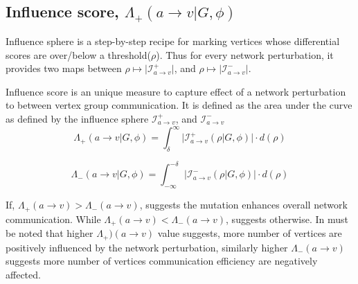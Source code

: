 \documentclass{article}
\begin{document}
\subsection{Influence score, $\Lambda_{+}(a\rightarrow v\vert G, \phi)$}\label{sec:infscore}
Influence sphere is a step-by-step recipe for marking vertices whose differential scores are over/below a threshold($\rho$). Thus for every network perturbation, it provides two maps between $\rho \mapsto \vert \mathcal{I}^{+}_{a\rightarrow v}\vert$, and $\rho \mapsto \vert \mathcal{I}^{-}_{a\rightarrow v} \vert$.
\par
Influence score is an unique measure to capture effect of a network perturbation to between vertex group communication. It is defined as the area under the curve as defined by the influence sphere $\mathcal{I}^{+}_{a\rightarrow v}$, and $\mathcal{I}^{-}_{a\rightarrow v}$
\begin{equation*}
    \Lambda_{+}(a\rightarrow v\vert G, \phi) = \int^{\infty}_{\delta} \vert \mathcal{I}^{+}_{a\rightarrow v}(\rho\vert G,\phi)\vert\cdot d(\rho)
\end{equation*}

\begin{equation*}
    \Lambda_{-}(a\rightarrow v\vert G, \phi) = \int^{-\delta}_{-\infty} \vert \mathcal{I}^{-}_{a\rightarrow v}(\rho\vert G,\phi)\vert \cdot d(\rho)
\end{equation*}

If, $\Lambda_{+}(a\rightarrow v) > \Lambda_{-}(a\rightarrow v)$, suggests the mutation enhances overall network communication. While $\Lambda_{+}(a\rightarrow v) < \Lambda_{-}(a\rightarrow v)$, suggests otherwise. In must be noted that higher $\Lambda_{+})(a\rightarrow v)$ value suggests, more number of vertices are positively influenced by the network perturbation, similarly higher $\Lambda_{-}(a\rightarrow v)$ suggests more number of vertices communication efficiency are negatively affected.
\end{document}
